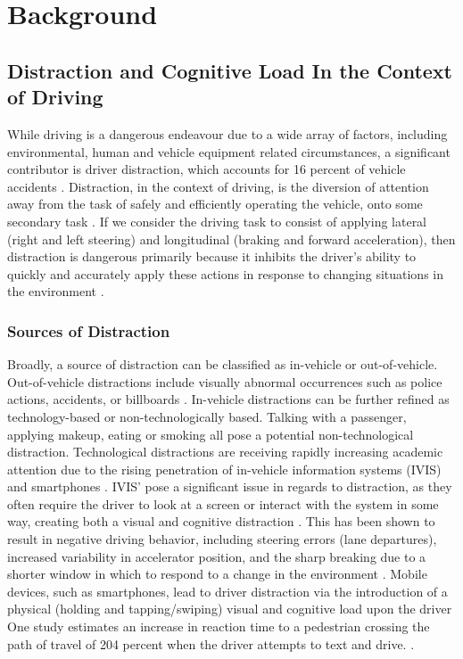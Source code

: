\chapter{Background} \label{CH:background}

\section{Distraction and Cognitive Load In the Context of Driving}\label{Sect:distraction}

While driving is a dangerous endeavour due to a wide array of factors, including environmental, human and vehicle equipment related circumstances, a significant contributor is driver distraction, which accounts for 16 percent of vehicle accidents \cite{distracted_nhtsa_17}. Distraction, in the context of driving, is the diversion of attention away from the task of safely and efficiently operating the vehicle, onto some secondary task \cite{regan2011driver}. If we consider the driving task to consist of applying lateral (right and left steering) and longitudinal (braking and forward acceleration), then distraction is dangerous primarily because it inhibits the driver's ability to quickly and accurately apply these actions in response to changing situations in the environment \cite{pettitt2005defining}.

\subsection{Sources of Distraction}
Broadly, a source of distraction can be classified as in-vehicle or out-of-vehicle. Out-of-vehicle distractions include visually abnormal occurrences such as police actions, accidents, or billboards \cite{edquist2011effects}. In-vehicle distractions can be further refined as technology-based or non-technologically based. Talking with a passenger, applying makeup, eating or smoking all pose a potential non-technological distraction. Technological distractions are receiving rapidly increasing academic attention due to the rising penetration of in-vehicle information systems (IVIS) and smartphones \cite{bayly200812}. IVIS' pose a significant issue in regards to distraction, as they often require the driver to look at a screen or interact with the system in some way, creating both a visual and cognitive distraction \cite{birrell2011impact}. This has been shown to result in negative driving behavior, including steering errors (lane departures), increased variability in accelerator position, and the sharp breaking due to a shorter window in which to respond to a change in the environment \cite{reyes_influence_2004}. Mobile devices, such as smartphones, lead to driver distraction via the introduction of a physical (holding and tapping/swiping) visual and cognitive load upon the driver One study estimates an increase in reaction time to a pedestrian crossing the path of travel of 204 percent when the driver attempts to text and drive. \cite{CHOUDHARY2017351}.

